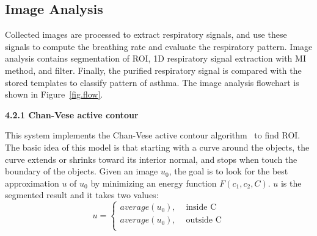 \subsection{Image Analysis}
Collected images are processed to extract respiratory signals, and use these signals to compute the breathing rate and evaluate the respiratory pattern. Image analysis contains segmentation of ROI, 1D respiratory signal extraction with MI method, and filter. Finally, the purified respiratory signal is compared with the stored templates to classify pattern of asthma. The image analysis flowchart is shown in Figure~\ref{fig.flow}.

\textbf{4.2.1 Chan-Vese active contour}

 This system implements the Chan-Vese active contour algorithm~\cite{Chan:2001} to find ROI. The basic idea of this model is that starting with a curve around the objects, the curve extends or shrinks toward its interior normal, and stops when touch the boundary of the objects. Given an image $u_0$, the goal is to look for the best approximation $u$ of $u_0$ by minimizing an energy function $F(c_1, c_2, C)$. $u$ is the segmented result and it takes two values:
\begin{equation}
u=
\begin{cases}
average(u_0),  &\mbox{ inside C}\\
average(u_0),  &\mbox{ outside C}\\
\end{cases}
\end{equation}

